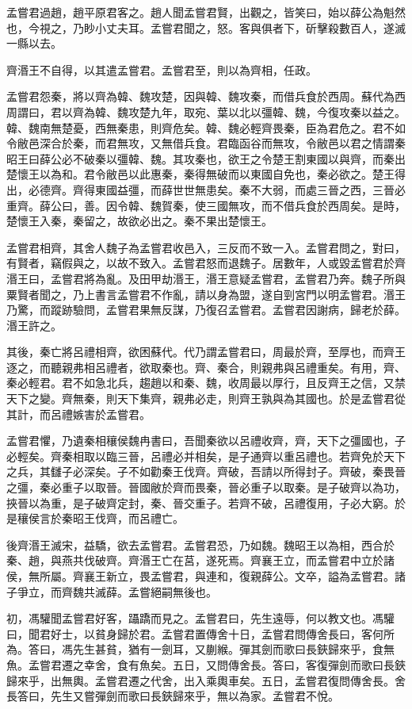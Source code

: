 孟嘗君過趙，趙平原君客之。趙人聞孟嘗君賢，出觀之，皆笑曰，始以薛公為魁然也，今視之，乃眇小丈夫耳。孟嘗君聞之，怒。客與俱者下，斫擊殺數百人，遂滅一縣以去。

齊湣王不自得，以其遣孟嘗君。孟嘗君至，則以為齊相，任政。

孟嘗君怨秦，將以齊為韓、魏攻楚，因與韓、魏攻秦，而借兵食於西周。蘇代為西周謂曰，君以齊為韓、魏攻楚九年，取宛、葉以北以彊韓、魏，今復攻秦以益之。韓、魏南無楚憂，西無秦患，則齊危矣。韓、魏必輕齊畏秦，臣為君危之。君不如令敝邑深合於秦，而君無攻，又無借兵食。君臨函谷而無攻，令敝邑以君之情謂秦昭王曰薛公必不破秦以彊韓、魏。其攻秦也，欲王之令楚王割東國以與齊，而秦出楚懷王以為和。君令敝邑以此惠秦，秦得無破而以東國自免也，秦必欲之。楚王得出，必德齊。齊得東國益彊，而薛世世無患矣。秦不大弱，而處三晉之西，三晉必重齊。薛公曰，善。因令韓、魏賀秦，使三國無攻，而不借兵食於西周矣。是時，楚懷王入秦，秦留之，故欲必出之。秦不果出楚懷王。

孟嘗君相齊，其舍人魏子為孟嘗君收邑入，三反而不致一入。孟嘗君問之，對曰，有賢者，竊假與之，以故不致入。孟嘗君怒而退魏子。居數年，人或毀孟嘗君於齊湣王曰，孟嘗君將為亂。及田甲劫湣王，湣王意疑孟嘗君，孟嘗君乃奔。魏子所與粟賢者聞之，乃上書言孟嘗君不作亂，請以身為盟，遂自剄宮門以明孟嘗君。湣王乃驚，而蹤跡驗問，孟嘗君果無反謀，乃復召孟嘗君。孟嘗君因謝病，歸老於薛。湣王許之。

其後，秦亡將呂禮相齊，欲困蘇代。代乃謂孟嘗君曰，周最於齊，至厚也，而齊王逐之，而聽親弗相呂禮者，欲取秦也。齊、秦合，則親弗與呂禮重矣。有用，齊、秦必輕君。君不如急北兵，趨趙以和秦、魏，收周最以厚行，且反齊王之信，又禁天下之變。齊無秦，則天下集齊，親弗必走，則齊王孰與為其國也。於是孟嘗君從其計，而呂禮嫉害於孟嘗君。

孟嘗君懼，乃遺秦相穰侯魏冉書曰，吾聞秦欲以呂禮收齊，齊，天下之彊國也，子必輕矣。齊秦相取以臨三晉，呂禮必并相矣，是子通齊以重呂禮也。若齊免於天下之兵，其讎子必深矣。子不如勸秦王伐齊。齊破，吾請以所得封子。齊破，秦畏晉之彊，秦必重子以取晉。晉國敝於齊而畏秦，晉必重子以取秦。是子破齊以為功，挾晉以為重，是子破齊定封，秦、晉交重子。若齊不破，呂禮復用，子必大窮。於是穰侯言於秦昭王伐齊，而呂禮亡。

後齊湣王滅宋，益驕，欲去孟嘗君。孟嘗君恐，乃如魏。魏昭王以為相，西合於秦、趙，與燕共伐破齊。齊湣王亡在莒，遂死焉。齊襄王立，而孟嘗君中立於諸侯，無所屬。齊襄王新立，畏孟嘗君，與連和，復親薛公。文卒，謚為孟嘗君。諸子爭立，而齊魏共滅薛。孟嘗絕嗣無後也。

初，馮驩聞孟嘗君好客，躡蹻而見之。孟嘗君曰，先生遠辱，何以教文也。馮驩曰，聞君好士，以貧身歸於君。孟嘗君置傳舍十日，孟嘗君問傳舍長曰，客何所為。答曰，馮先生甚貧，猶有一劍耳，又蒯緱。彈其劍而歌曰長鋏歸來乎，食無魚。孟嘗君遷之幸舍，食有魚矣。五日，又問傳舍長。答曰，客復彈劍而歌曰長鋏歸來乎，出無輿。孟嘗君遷之代舍，出入乘輿車矣。五日，孟嘗君復問傳舍長。舍長答曰，先生又嘗彈劍而歌曰長鋏歸來乎，無以為家。孟嘗君不悅。

